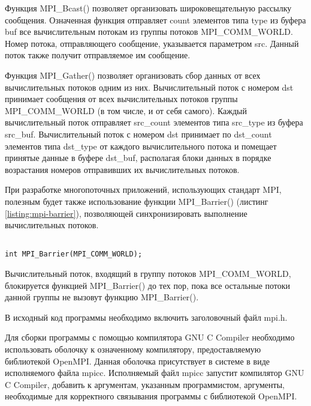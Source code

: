 \begin{itemize}
\begin{lstlisting}
\end{lstlisting}
\mylistingend

	Функция MPI\_Bcast() позволяет организовать широковещательную рассылку сообщения. Означенная функция отправляет count элементов типа type из буфера buf все вычислительным потокам из группы потоков MPI\_COMM\_WORLD. Номер потока, отправляющего сообщение, указывается параметром src. Данный поток также получит отправляемое им сообщение.
	
	Функция MPI\_Gather() позволяет организовать сбор данных от всех вычислительных потоков одним из них. Вычислительный поток с номером dst принимает сообщения от всех вычислительных потоков группы MPI\_COMM\_WORLD (в том числе, и от себя самого). Каждый вычислительный поток отправляет src\_count элементов типа src\_type из буфера src\_buf. Вычислительный поток с номером dst принимает по dst\_count элементов типа dst\_type от каждого вычислительного потока и помещает принятые данные в буфере dst\_buf, располагая блоки данных в порядке возрастания номеров отправивших их вычислительных потоков.

\end{itemize}

При разработке многопоточных приложений, использующих стандарт MPI, полезным будет также использование функции MPI\_\linebreak Barrier() (листинг \ref{listing:mpi-barrier}), позволяющей синхронизировать выполнение вычислительных потоков.

\begin{lstlisting}

int MPI_Barrier(MPI_COMM_WORLD);

\end{lstlisting}
\mylistingend

Вычислительный поток, входящий в группу потоков MPI\_\linebreak COMM\_WORLD, блокируется функцией MPI\_Barrier() до тех пор, пока все остальные потоки данной группы не вызовут функцию MPI\_Barrier().


В исходный код программы необходимо включить заголовочный файл mpi.h.

Для сборки программы с помощью компилятора GNU C Compiler необходимо использовать оболочку к означенному компилятору, пре\-доставляемую библиотекой OpenMPI. Данная оболочка присутствует в системе в виде исполняемого файла mpicc. Исполняемый файл mpicc запустит компилятор GNU C Compiler, добавить к аргументам, указанным программистом, аргументы, необходимые для корректного связывания программы с библиотекой OpenMPI.

